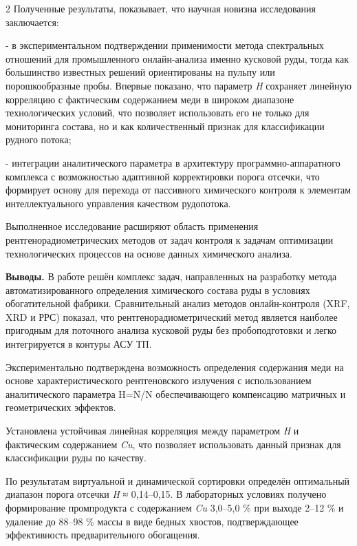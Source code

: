 \begin{multicols}{2}
Полученные результаты, показывает, что научная новизна исследования
заключается:

- в экспериментальном подтверждении применимости метода спектральных
отношений для промышленного онлайн-анализа именно кусковой руды, тогда
как большинство известных решений ориентированы на пульпу или
порошкообразные пробы. Впервые показано, что параметр \emph{H} сохраняет
линейную корреляцию с фактическим содержанием меди в широком диапазоне
технологических условий, что позволяет использовать его не только для
мониторинга состава, но и как количественный признак для классификации
рудного потока;

- интеграции аналитического параметра в архитектуру
программно-аппаратного комплекса с возможностью адаптивной корректировки
порога отсечки, что формирует основу для перехода от пассивного
химического контроля к элементам интеллектуального управления качеством
рудопотока.

Выполненное исследование расширяют область применения
рентгенорадиометрических методов от задач контроля к задачам оптимизации
технологических процессов на основе данных химического анализа.

{\bfseries Выводы.} В работе решён комплекс задач, направленных на
разработку метода автоматизированного определения химического состава
руды в условиях обогатительной фабрики. Сравнительный анализ методов
онлайн-контроля (XRF, XRD и РРС) показал, что рентгенорадиометрический
метод является наиболее пригодным для поточного анализа кусковой руды
без пробоподготовки и легко интегрируется в контуры АСУ ТП.

Экспериментально подтверждена возможность определения содержания меди на
основе характеристического рентгеновского излучения с использованием
аналитического параметра H=N/N
обеспечивающего компенсацию матричных и геометрических эффектов.

Установлена устойчивая линейная корреляция между параметром \emph{H} и
фактическим содержанием \emph{Cu}, что позволяет использовать данный
признак для классификации руды по качеству.

По результатам виртуальной и динамической сортировки определён
оптимальный диапазон порога отсечки \emph{H} ≈ 0,14--0,15. В
лабораторных условиях получено формирование промпродукта с содержанием
\emph{Cu} 3,0--5,0 \% при выходе 2--12 \% и удаление до 88--98 \% массы
в виде бедных хвостов, подтверждающее эффективность предварительного
обогащения.


\end{multicols}
